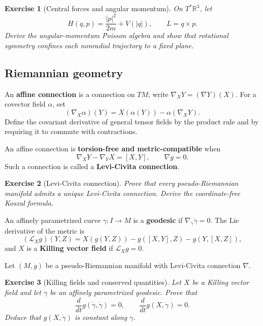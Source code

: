 \documentclass{article}
\newtheorem{exercise}{Exercise}
\begin{document}
\begin{exercise}[Central forces and angular momentum]\leavevmode\par
\textit{On $T^*\mathbb R^3$, let}
\[
H(q,p)=\frac{|p|^2}{2m}+V(|q|),
\qquad
L=q\times p.
\]
\textit{Derive the angular-momentum Poisson algebra and show that rotational
symmetry confines each nonradial trajectory to a fixed plane.}
\end{exercise}

\subsection{Riemannian geometry}

An \textbf{affine connection} is a connection on $TM$; write
$\nabla_XY=(\nabla Y)(X)$.
For a covector field $\alpha$, set
\[
(\nabla_X\alpha)(Y)=X(\alpha(Y))-\alpha(\nabla_XY).
\]
Define the covariant derivative of general tensor fields by the product rule and by requiring it to commute with contractions.

An affine connection is \textbf{torsion-free and metric-compatible} when
\[
\nabla_XY-\nabla_YX=[X,Y],
\qquad
\nabla g=0.
\]
Such a connection is called a \textbf{Levi-Civita connection}.

\begin{exercise}[Levi-Civita connection]\leavevmode\par
\textit{Prove that every pseudo-Riemannian manifold admits a unique Levi-Civita connection. Derive the coordinate-free Koszul formula.}
\end{exercise}

An affinely parametrized curve $\gamma:I\to M$ is a \textbf{geodesic} if $\nabla_{\dot\gamma}\dot\gamma=0$. The Lie derivative of the metric is
\[
(\mathcal L_Xg)(Y,Z)
=X(g(Y,Z))-g([X,Y],Z)-g(Y,[X,Z]),
\]
and $X$ is a \textbf{Killing vector field} if $\mathcal L_Xg=0$.

Let $(M,g)$ be a pseudo-Riemannian manifold with Levi-Civita connection $\nabla$.

\begin{exercise}[Killing fields and conserved quantities]\leavevmode\par
\textit{Let $X$ be a Killing vector field and let $\gamma$ be an affinely parametrized geodesic. Prove that}
\[
\frac{d}{dt}g(\dot\gamma,\dot\gamma)=0,
\qquad
\frac{d}{dt}g(X,\dot\gamma)=0.
\]
\textit{Deduce that $g(X,\dot\gamma)$ is constant along $\gamma$.}
\end{exercise}
\end{document}

